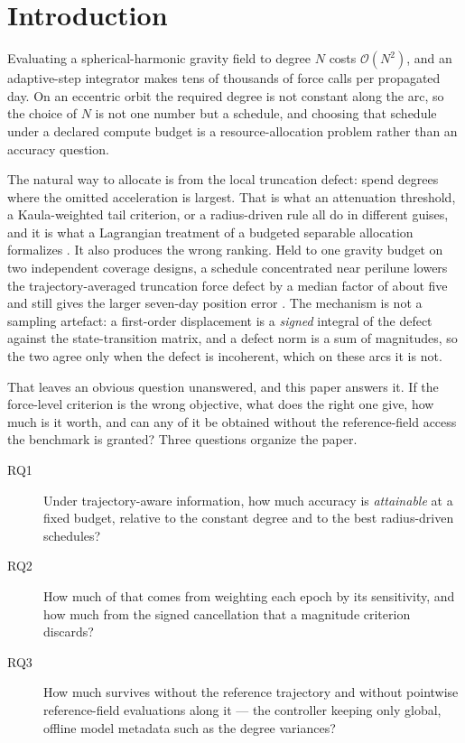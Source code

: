 \section{Introduction}
\label{sec:intro}

Evaluating a spherical-harmonic gravity field to degree $N$ costs
$\mathcal{O}(N^2)$, and an adaptive-step integrator makes tens of thousands of
force calls per propagated day. On an eccentric orbit the required degree is
not constant along the arc, so the choice of $N$ is not one number but a
schedule, and choosing that schedule under a declared compute budget is a
resource-allocation problem rather than an accuracy question.

The natural way to allocate is from the local truncation defect: spend degrees
where the omitted acceleration is largest. That is what an attenuation
threshold, a Kaula-weighted tail criterion, or a radius-driven rule all do in
different guises, and it is what a Lagrangian treatment of a budgeted
separable allocation formalizes \citep{everett1963generalized,
shoham1988efficient}. It also produces the wrong ranking. Held to one gravity
budget on two independent coverage designs, a schedule concentrated near
perilune lowers the trajectory-averaged truncation force defect by a median
factor of about five and still gives the larger seven-day position error
\citep[]{atallah2022radial}. The
mechanism is not a sampling artefact: a first-order displacement is a
\emph{signed} integral of the defect against the state-transition matrix, and a
defect norm is a sum of magnitudes, so the two agree only when the defect is
incoherent, which on these arcs it is not.


That leaves an obvious question unanswered, and this paper answers it. If the
force-level criterion is the wrong objective, what does the right one give, how
much is it worth, and can any of it be obtained without the reference-field
access the benchmark is granted? Three questions organize the paper.

\begin{description}
  \item[RQ1] Under trajectory-aware information, how much accuracy is
    \emph{attainable} at a fixed budget, relative to the constant degree and to
    the best radius-driven schedules?
  \item[RQ2] How much of that comes from weighting each epoch by its
    sensitivity, and how much from the signed cancellation that a magnitude
    criterion discards?
  \item[RQ3] How much survives without the reference trajectory and without
    pointwise reference-field evaluations along it --- the controller keeping
    only global, offline model metadata such as the degree variances?
\end{description}

